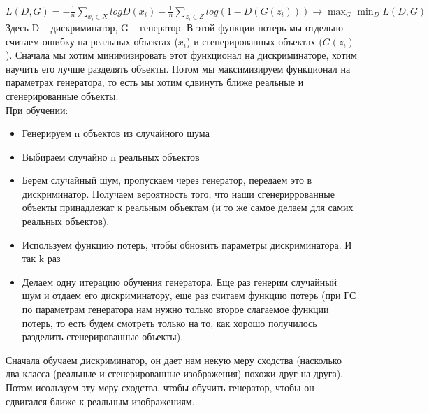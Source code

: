 $L(D,G) = -\displaystyle\frac{1}{n}\sum\limits_{x_{i} \in X}log D(x_{i}) -\displaystyle\frac{1}{n}\sum\limits_{z_{i} \in Z}log(1 - D(G(z_{i}))) \rightarrow \max_{G} \min_{D} L(D,G) $ \\

Здесь D -- дискриминатор, G -- генератор. В этой функции потерь мы отдельно считаем ошибку на реальных объектах ($x_{i}$) и сгенерированных объектах ($G(z_{i})$). Сначала мы хотим минимизировать этот функционал на дискриминаторе, хотим научить его лучше разделять объекты. Потом мы максимизируем функционал на параметрах генератора, то есть мы хотим сдвинуть ближе реальные и сгенерированные объекты. \\

При обучении: \\ 
\begin{itemize}\setlength\itemsep{0.2em}
    \item Генерируем n объектов из случайного шума 
    \item Выбираем случайно n реальных объектов \item Берем случайный шум, пропускаем через генератор, передаем это в дискриминатор. Получаем вероятность того, что наши сгенериррованные объекты принадлежат к реальным объектам (и то же самое делаем для самих реальных объектов). 
    \item Используем функцию потерь, чтобы обновить параметры дискриминатора. И так k раз 
    \item Делаем одну итерацию обучения генератора. Еще раз генерим случайный шум и отдаем его дискриминатору, еще раз считаем функцию потерь (при ГС по параметрам генератора нам нужно только второе слагаемое функции потерь, то есть будем смотреть только на то, как хорошо получилось разделить сгенерированные объекты). 
\end{itemize}

Сначала обучаем дискриминатор, он дает нам некую меру сходства (насколько два класса (реальные и сгенерированные изображения) похожи друг на друга). Потом исользуем эту меру сходства, чтобы обучить генератор, чтобы он сдвигался ближе к реальным изображениям. 
